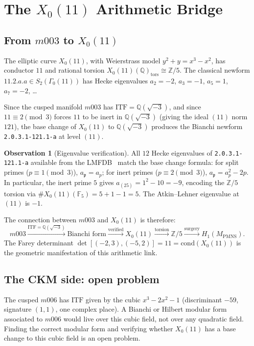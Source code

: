 \documentclass[11pt,a4paper]{article}
\theoremstyle{definition}
\newtheorem{observation}[theorem]{Observation}
\theoremstyle{remark}
\newcommand{\MPMNS}{M_{\mathrm{PMNS}}}
\newcommand{\QQ}{\mathbb{Q}}
\newcommand{\Zfive}{\mathbb{Z}/5}
\newcommand{\ITF}{\mathrm{ITF}}
\begin{document}
\section{The $X_0(11)$ Arithmetic Bridge}
\label{sec:x011}

\subsection{From $m003$ to $X_0(11)$}

The elliptic curve $X_0(11)$, with Weierstrass model
$y^2 + y = x^3 - x^2$, has conductor $11$ and rational torsion
$X_0(11)(\QQ)_{\mathrm{tors}} \cong \Zfive$.
The classical newform $11.2.a.a \in S_2(\Gamma_0(11))$ has Hecke
eigenvalues $a_2=-2$, $a_3=-1$, $a_5=1$, $a_7=-2$, \ldots

Since the cusped manifold $m003$ has $\ITF = \QQ(\sqrt{-3})$, and
since $11 \equiv 2\pmod{3}$ forces $11$ to be inert in $\QQ(\sqrt{-3})$
(giving the ideal $(11)$ norm $121$), the base change of $X_0(11)$ to
$\QQ(\sqrt{-3})$ produces the Bianchi newform \texttt{2.0.3.1-121.1-a}
at level $(11)$.

\begin{observation}[Eigenvalue verification]
\label{obs:lmfdb}
All $12$ Hecke eigenvalues of \texttt{2.0.3.1-121.1-a} available
from the LMFDB~\cite{LMFDB} match the base change formula:
for split primes ($p \equiv 1\pmod 3$), $a_\mathfrak{p} = a_p$;
for inert primes ($p \equiv 2\pmod 3$), $a_{\mathfrak{p}} = a_p^2 - 2p$.
In particular, the inert prime $5$ gives
$a_{(25)} = 1^2 - 10 = -9$, encoding the $\Zfive$ torsion
via $\#X_0(11)(\mathbb{F}_5) = 5+1-1 = 5$.
The Atkin--Lehner eigenvalue at $(11)$ is $-1$.
\end{observation}

The connection between $m003$ and $X_0(11)$ is therefore:
\[
m003 \xrightarrow{\ITF = \QQ(\sqrt{-3})} \text{Bianchi form}
\xrightarrow{\text{verified}} X_0(11)
\xrightarrow{\text{torsion}} \Zfive \xrightarrow{\text{surgery}} H_1(\MPMNS).
\]
The Farey determinant $\det[(-2,3),(-5,2)] = 11 = \mathrm{cond}(X_0(11))$
is the geometric manifestation of this arithmetic link.

\subsection{The CKM side: open problem}

The cusped $m006$ has $\ITF$ given by the cubic $x^3-2x^2-1$
(discriminant $-59$, signature $(1,1)$, one complex place).
A Bianchi or Hilbert modular form associated to $m006$ would live over
this cubic field, not over any quadratic field.
Finding the correct modular form and verifying whether $X_0(11)$ has
a base change to this cubic field is an open problem.
\end{document}
